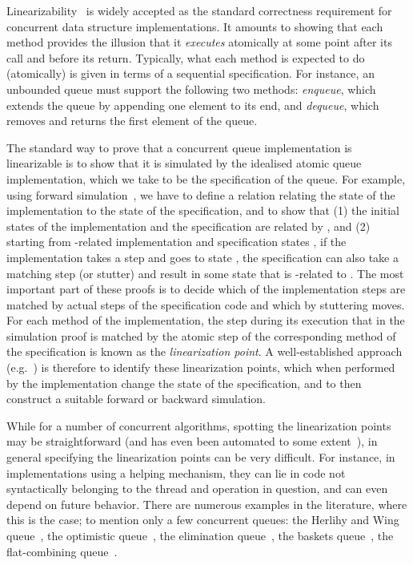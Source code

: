 \documentclass{LMCS}
\begin{document}
Linearizability~\cite{HW1990} is widely accepted as the standard correctness
requirement for concurrent data structure implementations.
It amounts to showing that each method provides the illusion that it {\em executes} atomically at some point after its call and before its return.
Typically, what each method is expected to do (atomically) is given in terms of a sequential specification.
For instance, an unbounded queue must support the following two methods: 
\emph{enqueue}, which extends the queue by appending one element to its end, 
and \emph{dequeue}, which removes and returns the first element of the queue.

The standard way to prove that a concurrent queue implementation is linearizable is
to show that it is simulated by the idealised atomic queue implementation, 
which we take to be the specification of the queue.
For example, using forward simulation~\cite{LV1995}, we have to define 
a relation  relating the state of the implementation to the state of the specification,
and to show that 
(1) the initial states of the implementation and the specification are related by , and 
(2) starting from -related implementation and specification states , 
if the implementation takes a step and goes to state , 
the specification can also take a matching step (or stutter) and 
result in some state  that is -related to .
The most important part of these proofs is to decide which of the implementation steps
are matched by actual steps of the specification code and which by stuttering moves.
For each method of the implementation, the step during its execution that in the 
simulation proof is matched by the atomic step of the corresponding method of the 
specification is known as the \emph{linearization point}.
A well-established approach (e.g.~\cite{AHH+2013,ARR+2007,CDG2005,DSW2011,DM2009,LCL+2009,SWD2012,Vaf2009,Vaf2010})
is therefore to identify these linearization points, 
which when performed by the implementation change the state of the specification, 
and to then construct a suitable forward or backward simulation.

While for a number of concurrent algorithms, spotting the
linearization points may be straightforward (and has even been automated to some extent~\cite{Vaf2010}), 
in general specifying the linearization points can be very difficult. 
For instance, in implementations using a helping mechanism, they can lie in code not syntactically belonging to the thread and operation in question, and can even depend on future behavior.
There are numerous examples in the literature, where this is the case;
to mention only a few concurrent queues: 
the Herlihy and Wing queue~\cite{HW1990},
the optimistic queue~\cite{LS2004}, 
the elimination queue~\cite{MNS+2005}, 
the baskets queue~\cite{HSS2007}, 
the flat-combining queue~\cite{HIS+2010}.
\end{document}
